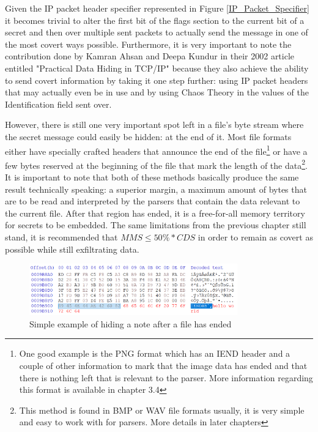\begin{multicols*}{2}
Given the IP packet header specifier represented in Figure \ref{IP_Packet_Specifier} it becomes trivial to alter the first bit of the flags section to the current bit of a secret and then over multiple sent packets to actually send the message in one of the most covert ways possible. Furthermore, it is very important to note the contribution done by Kamran Ahsan and Deepa Kundur in their 2002 article entitled "Practical Data Hiding in TCP/IP"\cite{practical_data_hiding_tcp_ip} because they also achieve the ability to send covert information by taking it one step further: using IP packet headers that may actually even be in use and by using Chaos Theory in the values of the Identification field sent over.

However, there is still one very important spot left in a file's byte stream where the secret message could easily be hidden: at the end of it. Most file formats either have specially crafted headers that announce the end of the file\footnote{One good example is the PNG format which has an IEND header and a couple of other information to mark that the image data has ended and that there is nothing left that is relevant to the parser. More information regarding this format is available in chapter 3.4} or have a few bytes reserved at the beginning of the file that mark the length of the data\footnote{This method is found in BMP or WAV file formats usually, it is very simple and easy to work with for parsers. More details in later chapters}. It is important to note that both of these methods basically produce the same result technically speaking: a superior margin, a maximum amount of bytes that are to be read and interpreted by the parsers that contain the data relevant to the current file. After that region has ended, it is a free-for-all memory territory for secrets to be embedded. The same limitations from the previous chapter still stand, it is recommended that $MMS \leq  50\% * CDS$ in order to remain as covert as possible while still exfiltrating data.

\begin{figure}[H]
    \centering
    \includegraphics[width=9cm,keepaspectratio]{pics/secret_after_file_ended}
    \caption{Simple example of hiding a note after a file has ended}
    \label{secret_after_file_ended}
\end{figure}



\end{multicols*}